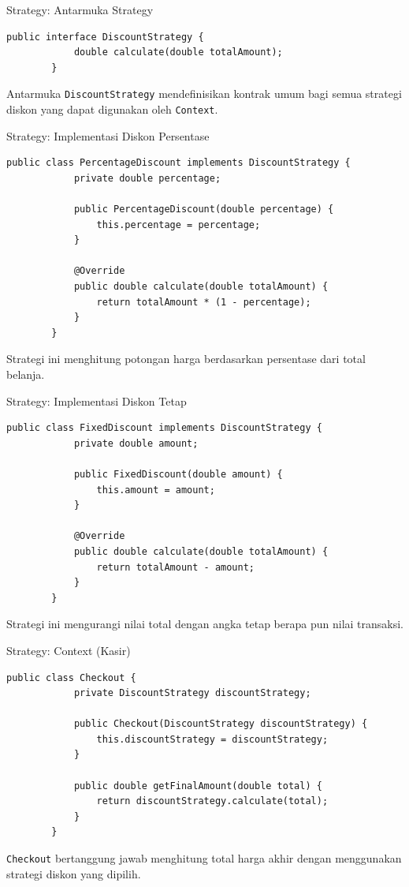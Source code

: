 \documentclass[aspectratio=169, table]{beamer}
\begin{document}
\begin{frame}[fragile]{Strategy: Antarmuka Strategy}
	\vspace{5pt}
	\begin{lstlisting}[style=JavaStyle]
		public interface DiscountStrategy {
			double calculate(double totalAmount);
		}
	\end{lstlisting}
	\vspace{4pt}
	\small Antarmuka \texttt{DiscountStrategy} mendefinisikan kontrak umum bagi semua strategi diskon yang dapat digunakan oleh \texttt{Context}.
\end{frame}

\begin{frame}[fragile]{Strategy: Implementasi Diskon Persentase}
	\vspace{5pt}
	\begin{lstlisting}[style=JavaStyle]
		public class PercentageDiscount implements DiscountStrategy {
			private double percentage;
			
			public PercentageDiscount(double percentage) {
				this.percentage = percentage;
			}
			
			@Override
			public double calculate(double totalAmount) {
				return totalAmount * (1 - percentage);
			}
		}
	\end{lstlisting}
	\vspace{4pt}
	\small Strategi ini menghitung potongan harga berdasarkan persentase dari total belanja.
\end{frame}

\begin{frame}[fragile]{Strategy: Implementasi Diskon Tetap}
	\vspace{5pt}
	\begin{lstlisting}[style=JavaStyle]
		public class FixedDiscount implements DiscountStrategy {
			private double amount;
			
			public FixedDiscount(double amount) {
				this.amount = amount;
			}
			
			@Override
			public double calculate(double totalAmount) {
				return totalAmount - amount;
			}
		}
	\end{lstlisting}
	\vspace{4pt}
	\small Strategi ini mengurangi nilai total dengan angka tetap berapa pun nilai transaksi.
\end{frame}

\begin{frame}[fragile]{Strategy: Context (Kasir)}
	\vspace{5pt}
	\begin{lstlisting}[style=JavaStyle]
		public class Checkout {
			private DiscountStrategy discountStrategy;
			
			public Checkout(DiscountStrategy discountStrategy) {
				this.discountStrategy = discountStrategy;
			}
			
			public double getFinalAmount(double total) {
				return discountStrategy.calculate(total);
			}
		}
	\end{lstlisting}
	\vspace{4pt}
	\small \texttt{Checkout} bertanggung jawab menghitung total harga akhir dengan menggunakan strategi diskon yang dipilih.
\end{frame}
\end{document}
